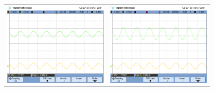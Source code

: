 \begin{figure}[H]
    \centering
    \begin{tabular}{c c}
        \includegraphics[scale=0.2]{../EJ5/Mediciones/Osciloscopio/Senoide_3600_Minimo/scope_9.png} & 
        \includegraphics[scale=0.2]{../EJ5/Mediciones/Osciloscopio/Senoide_3600_Minimo/scope_10.png} \\

\end{tabular}
\end{figure}
